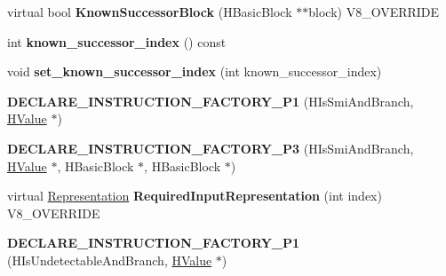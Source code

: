 \begin{DoxyCompactItemize}
\item 
\hypertarget{classv8_1_1internal_1_1_v8___f_i_n_a_l_a85ba341b22db01ee3cd7145d9f8e9b99}{}virtual bool {\bfseries Known\+Successor\+Block} (H\+Basic\+Block $\ast$$\ast$block) V8\+\_\+\+O\+V\+E\+R\+R\+I\+D\+E\label{classv8_1_1internal_1_1_v8___f_i_n_a_l_a85ba341b22db01ee3cd7145d9f8e9b99}

\item 
\hypertarget{classv8_1_1internal_1_1_v8___f_i_n_a_l_a0d29bbcf87f0d2ce8a36de5a25f5a129}{}int {\bfseries known\+\_\+successor\+\_\+index} () const \label{classv8_1_1internal_1_1_v8___f_i_n_a_l_a0d29bbcf87f0d2ce8a36de5a25f5a129}

\item 
\hypertarget{classv8_1_1internal_1_1_v8___f_i_n_a_l_a872a819ac2bb8a80448280f8adc52552}{}void {\bfseries set\+\_\+known\+\_\+successor\+\_\+index} (int known\+\_\+successor\+\_\+index)\label{classv8_1_1internal_1_1_v8___f_i_n_a_l_a872a819ac2bb8a80448280f8adc52552}

\item 
\hypertarget{classv8_1_1internal_1_1_v8___f_i_n_a_l_a234f205fd3576cf098660a7645aae6d0}{}{\bfseries D\+E\+C\+L\+A\+R\+E\+\_\+\+I\+N\+S\+T\+R\+U\+C\+T\+I\+O\+N\+\_\+\+F\+A\+C\+T\+O\+R\+Y\+\_\+\+P1} (H\+Is\+Smi\+And\+Branch, \hyperlink{classv8_1_1internal_1_1_h_value}{H\+Value} $\ast$)\label{classv8_1_1internal_1_1_v8___f_i_n_a_l_a234f205fd3576cf098660a7645aae6d0}

\item 
\hypertarget{classv8_1_1internal_1_1_v8___f_i_n_a_l_a9204130796c856cedc4c2d6e907b8227}{}{\bfseries D\+E\+C\+L\+A\+R\+E\+\_\+\+I\+N\+S\+T\+R\+U\+C\+T\+I\+O\+N\+\_\+\+F\+A\+C\+T\+O\+R\+Y\+\_\+\+P3} (H\+Is\+Smi\+And\+Branch, \hyperlink{classv8_1_1internal_1_1_h_value}{H\+Value} $\ast$, H\+Basic\+Block $\ast$, H\+Basic\+Block $\ast$)\label{classv8_1_1internal_1_1_v8___f_i_n_a_l_a9204130796c856cedc4c2d6e907b8227}

\item 
\hypertarget{classv8_1_1internal_1_1_v8___f_i_n_a_l_a6c6d1f37f40b113d8f4062f1ffff7215}{}virtual \hyperlink{classv8_1_1internal_1_1_representation}{Representation} {\bfseries Required\+Input\+Representation} (int index) V8\+\_\+\+O\+V\+E\+R\+R\+I\+D\+E\label{classv8_1_1internal_1_1_v8___f_i_n_a_l_a6c6d1f37f40b113d8f4062f1ffff7215}

\item 
\hypertarget{classv8_1_1internal_1_1_v8___f_i_n_a_l_ac1c9a8e1ec8f52af4c9a03fdd7d9e90f}{}{\bfseries D\+E\+C\+L\+A\+R\+E\+\_\+\+I\+N\+S\+T\+R\+U\+C\+T\+I\+O\+N\+\_\+\+F\+A\+C\+T\+O\+R\+Y\+\_\+\+P1} (H\+Is\+Undetectable\+And\+Branch, \hyperlink{classv8_1_1internal_1_1_h_value}{H\+Value} $\ast$)\label{classv8_1_1internal_1_1_v8___f_i_n_a_l_ac1c9a8e1ec8f52af4c9a03fdd7d9e90f}


\end{DoxyCompactItemize}
